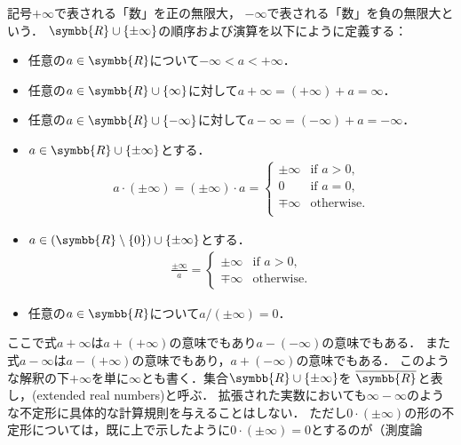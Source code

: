 \documentclass[../main.tex]{subfiles}
\begin{document}
\begin{definition} 記号\(+\infty\)で表される「数」を正の無限大，
\(- \infty\)で表される「数」を負の無限大という．
\(\symbb{R} \cup \{\pm \infty\}\)の順序および演算を以下にように定義する：
\begin{itemize}
    \item 任意の\(a \in \symbb{R}\)について\(- \infty < a < + \infty\)．
    \item 任意の\(a \in \symbb{R} \cup \{\infty\}\)に対して\(a + \infty = (+ \infty) + a = \infty\)．
    \item 任意の\(a \in \symbb{R} \cup \{-\infty\}\)に対して\(a - \infty = (- \infty) + a = -\infty\)．
    \item \(a \in \symbb{R} \cup \{\pm \infty\}\)とする．
        \begin{align*}
            a \cdot (\pm \infty) = (\pm \infty) \cdot a =
            \begin{cases}
                \pm \infty & \text{if \(a > 0\),}\\
                0          & \text{if \(a = 0\),}\\
                \mp \infty & \text{otherwise.} \\
            \end{cases}
        \end{align*}
    \item \(a \in (\symbb{R} \setminus \{0\}) \cup \{\pm \infty\}\)とする．
        \begin{align*}
            \frac{\pm \infty}{a} =
            \begin{cases}
                \pm \infty & \text{if \(a > 0\),}\\
                \mp \infty & \text{otherwise.}
            \end{cases}
        \end{align*}
    \item 任意の\(a \in \symbb{R}\)について\(a/(\pm \infty) = 0\)．
\end{itemize}
ここで式\(a + \infty\)は\(a + (+\infty)\)の意味でもあり\(a - (- \infty)\)の意味でもある．
また式\(a - \infty\)は\(a - (+ \infty)\)の意味でもあり，\(a + (- \infty)\)の意味でもある．
このような解釈の下\(+ \infty\)を単に\(\infty\)とも書く．集合\(\symbb{R} \cup \{\pm \infty\}\)を
\(\overline{\symbb{R}}\)と表し，(extended real numbers)と呼ぶ．
拡張された実数においても\(\infty - \infty\)のような不定形に具体的な計算規則を与えることはしない．
ただし\(0 \cdot (\pm \infty)\)の形の不定形については，既に上で示したように\(0 \cdot (\pm \infty) = 0\)とするのが（測度論
\end{definition}
\end{document}
